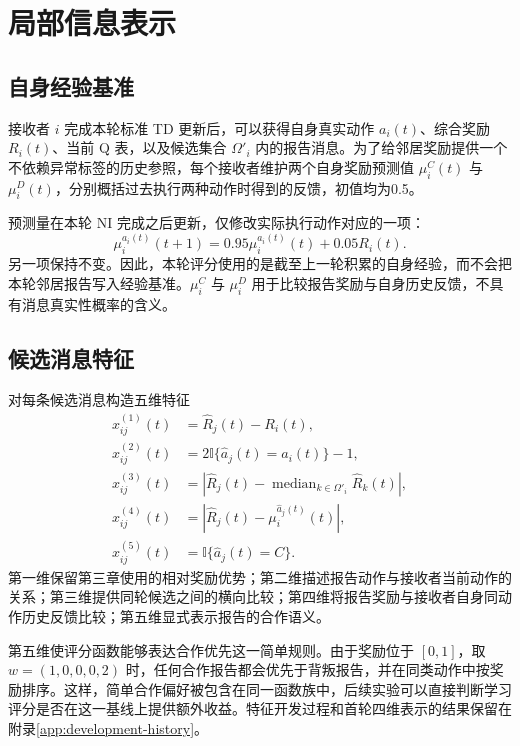 \section{局部信息表示}
\subsection{自身经验基准}

接收者 $i$ 完成本轮标准 TD 更新后，可以获得自身真实动作 $a_i(t)$、综合奖励 $R_i(t)$、当前 Q 表，以及候选集合 $\Omega'_i$ 内的报告消息。为了给邻居奖励提供一个不依赖异常标签的历史参照，每个接收者维护两个自身奖励预测值 $\mu_i^C(t)$ 与 $\mu_i^D(t)$，分别概括过去执行两种动作时得到的反馈，初值均为0.5。

预测量在本轮 NI 完成之后更新，仅修改实际执行动作对应的一项：
\begin{equation}
 \mu_i^{a_i(t)}(t+1)=0.95\mu_i^{a_i(t)}(t)+0.05R_i(t).
 \label{eq:w2-predictor}
\end{equation}
另一项保持不变。因此，本轮评分使用的是截至上一轮积累的自身经验，而不会把本轮邻居报告写入经验基准。$\mu_i^C$ 与 $\mu_i^D$ 用于比较报告奖励与自身历史反馈，不具有消息真实性概率的含义。

\subsection{候选消息特征}

对每条候选消息构造五维特征
\begin{equation}
 \begin{aligned}
 x_{ij}^{(1)}(t)&=\widehat R_j(t)-R_i(t),\\
 x_{ij}^{(2)}(t)&=2\mathbb I\{\widehat a_j(t)=a_i(t)\}-1,\\
 x_{ij}^{(3)}(t)&=\left|\widehat R_j(t)-\operatorname{median}_{k\in\Omega'_i}\widehat R_k(t)\right|,\\
 x_{ij}^{(4)}(t)&=\left|\widehat R_j(t)-\mu_i^{\widehat a_j(t)}(t)\right|,\\
 x_{ij}^{(5)}(t)&=\mathbb I\{\widehat a_j(t)=C\}.
 \end{aligned}
 \label{eq:w2-features}
\end{equation}
第一维保留第三章使用的相对奖励优势；第二维描述报告动作与接收者当前动作的关系；第三维提供同轮候选之间的横向比较；第四维将报告奖励与接收者自身同动作历史反馈比较；第五维显式表示报告的合作语义。

第五维使评分函数能够表达合作优先这一简单规则。由于奖励位于 $[0,1]$，取 $w=(1,0,0,0,2)$ 时，任何合作报告都会优先于背叛报告，并在同类动作中按奖励排序。这样，简单合作偏好被包含在同一函数族中，后续实验可以直接判断学习评分是否在这一基线上提供额外收益。特征开发过程和首轮四维表示的结果保留在附录\ref{app:development-history}。

